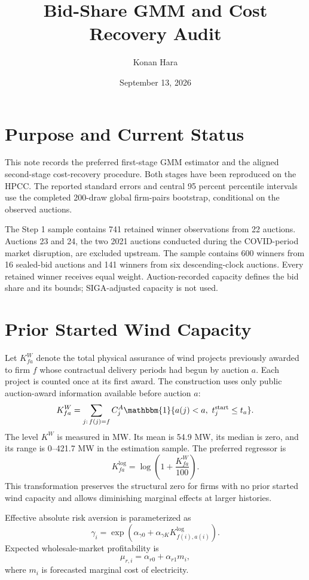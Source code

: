 \documentclass[10pt]{article}
\title{Bid-Share GMM and Cost Recovery Audit}
\author{Konan Hara}
\date{September 13, 2026}
\begin{document}
\maketitle

\section{Purpose and Current Status}

This note records the preferred first-stage GMM estimator and the aligned
second-stage cost-recovery procedure. Both stages have been reproduced on the
HPCC. The reported standard errors and central 95 percent percentile intervals
use the completed 200-draw global firm-pairs bootstrap, conditional on the
observed auctions.

The Step 1 sample contains 741 retained winner observations from 22 auctions.
Auctions 23 and 24, the two 2021 auctions conducted during the COVID-period
market disruption, are excluded upstream. The sample contains 600 winners from
16 sealed-bid auctions and 141 winners from six descending-clock auctions.
Every retained winner receives equal weight. Auction-recorded capacity defines
the bid share and its bounds; SIGA-adjusted capacity is not used.

\section{Prior Started Wind Capacity}

Let $K^{W}_{fa}$ denote the total physical assurance of wind projects
previously awarded to firm $f$ whose contractual delivery periods had begun by
auction $a$. Each project is counted once at its first award. The construction
uses only public auction-award information available before auction $a$:
\[
K^{W}_{fa}
=
\sum_{j:\,f(j)=f}
C_j^A
\mathbbm{1}\{a(j)<a,\ t^{\mathrm{start}}_j\leq t_a\}.
\]
The level $K^W$ is measured in MW. Its mean is 54.9 MW, its median is zero,
and its range is 0--421.7 MW in the estimation sample. The preferred regressor
is
\begin{equation}
K^{\log}_{fa}=\log\left(1+\frac{K^W_{fa}}{100}\right).
\label{eq:klog}
\end{equation}
This transformation preserves the structural zero for firms with no prior
started wind capacity and allows diminishing marginal effects at larger
histories.

Effective absolute risk aversion is parameterized as
\begin{equation}
\gamma_i
=
\exp\left(
\alpha_{\gamma0}
+\alpha_{\gamma K}K^{\log}_{f(i),a(i)}
\right).
\label{eq:gamma}
\end{equation}
Expected wholesale-market profitability is
\begin{equation}
\mu_{r,i}=\alpha_{r0}+\alpha_{r1}m_i,
\label{eq:mur}
\end{equation}
where $m_i$ is forecasted marginal cost of electricity.
\end{document}
